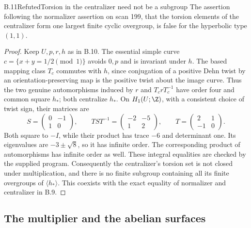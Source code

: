 \begin{claim}{B.11}{Refuted}{Torsion in the centralizer need not be a subgroup}
The assertion following the normalizer assertion on scan 199, that the torsion
elements of the centralizer form one largest finite cyclic overgroup, is false
for the hyperbolic type $(1,1)$.
\end{claim}
\begin{proof}
Keep $U,p,r,h$ as in B.10. The essential simple curve
$c=\{x+y=1/2\pmod1\}$ avoids $0,p$ and is invariant under $h$.
The based mapping class $T_c$ commutes with $h$, since conjugation of a positive
Dehn twist by an orientation-preserving map is the positive twist about the
image curve. Thus the two genuine automorphisms induced by $r$ and
$T_crT_c^{-1}$ have order four and common square $h_*$; both centralize $h_*$.
On $H_1(U;\Z)$, with a consistent choice of twist sign, their matrices are
\[
 S=\begin{pmatrix}0&-1\\1&0\end{pmatrix},\qquad
 TST^{-1}=\begin{pmatrix}-2&-5\\1&2\end{pmatrix},\qquad
 T=\begin{pmatrix}2&1\\-1&0\end{pmatrix}.
\]
Both square to $-I$, while their product has trace $-6$ and determinant one.
Its eigenvalues are $-3\pm\sqrt8$, so it has infinite order. The corresponding
product of automorphisms has infinite order as well. These integral equalities
are checked by the supplied program. Consequently the centralizer's torsion
set is not closed under multiplication, and there is no finite subgroup
containing all its finite overgroups of $\langle h_*\rangle$. This coexists with
the exact equality of normalizer and centralizer in B.9.
\end{proof}

\subsection{The multiplier and the abelian surfaces}

